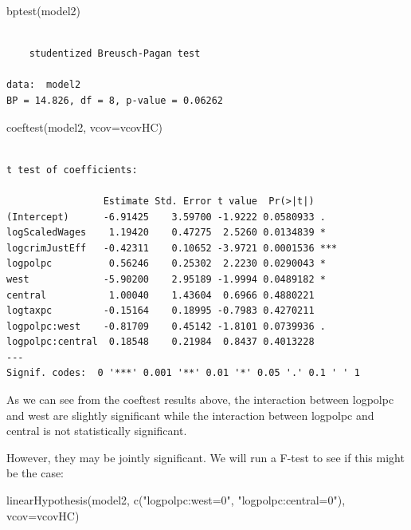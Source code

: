 \documentclass[]{article}
\newenvironment{Shaded}{}{}
\newcommand{\DataTypeTok}[1]{#1}
\newcommand{\KeywordTok}[1]{\textcolor[rgb]{0.00,0.00,1.00}{#1}}
\newcommand{\NormalTok}[1]{#1}
\newcommand{\StringTok}[1]{\textcolor[rgb]{0.00,0.50,0.50}{#1}}
\begin{document}
\begin{Shaded}
\begin{Highlighting}[]
\KeywordTok{bptest}\NormalTok{(model2)}
\end{Highlighting}
\end{Shaded}

\begin{verbatim}

    studentized Breusch-Pagan test

data:  model2
BP = 14.826, df = 8, p-value = 0.06262
\end{verbatim}

\begin{Shaded}
\begin{Highlighting}[]
\KeywordTok{coeftest}\NormalTok{(model2, }\DataTypeTok{vcov=}\NormalTok{vcovHC)}
\end{Highlighting}
\end{Shaded}

\begin{verbatim}

t test of coefficients:

                 Estimate Std. Error t value  Pr(>|t|)    
(Intercept)      -6.91425    3.59700 -1.9222 0.0580933 .  
logScaledWages    1.19420    0.47275  2.5260 0.0134839 *  
logcrimJustEff   -0.42311    0.10652 -3.9721 0.0001536 ***
logpolpc          0.56246    0.25302  2.2230 0.0290043 *  
west             -5.90200    2.95189 -1.9994 0.0489182 *  
central           1.00040    1.43604  0.6966 0.4880221    
logtaxpc         -0.15164    0.18995 -0.7983 0.4270211    
logpolpc:west    -0.81709    0.45142 -1.8101 0.0739936 .  
logpolpc:central  0.18548    0.21984  0.8437 0.4013228    
---
Signif. codes:  0 '***' 0.001 '**' 0.01 '*' 0.05 '.' 0.1 ' ' 1
\end{verbatim}

As we can see from the coeftest results above, the interaction between
logpolpc and west are slightly significant while the interaction between
logpolpc and central is not statistically significant.

However, they may be jointly significant. We will run a F-test to see if
this might be the case:

\begin{Shaded}
\begin{Highlighting}[]
\KeywordTok{linearHypothesis}\NormalTok{(model2, }\KeywordTok{c}\NormalTok{(}\StringTok{"logpolpc:west=0"}\NormalTok{, }\StringTok{"logpolpc:central=0"}\NormalTok{), }\DataTypeTok{vcov=}\NormalTok{vcovHC)}
\end{Highlighting}
\end{Shaded}
\end{document}
